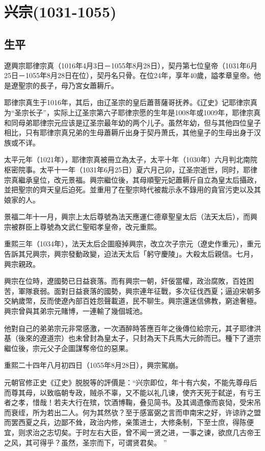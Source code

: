 
\section{兴宗\tiny(1031-1055)}

\subsection{生平}

遼興宗耶律宗真（1016年4月3日－1055年8月28日），契丹第七位皇帝（1031年6月25日－1055年8月28日在位），契丹名只骨。在位24年，享年40歲，謚孝章皇帝。他是遼聖宗的長子，母乃宮女蕭耨斤。

耶律宗真生于1016年，其后，由辽圣宗的皇后蕭菩薩哥抚养。《辽史》记耶律宗真为“圣宗长子”，实际上辽圣宗第六子耶律宗愿的生年是1008年或1009年，耶律宗真和同母弟耶律宗元应该是辽圣宗最年幼的两个儿子。虽然年幼，但与其他四位皇子相比，只有耶律宗真兄弟的生母蕭耨斤出身于契丹萧氏，其他皇子的生母出身于汉族或不详。

太平元年（1021年），耶律宗真被冊立為太子，太平十年（1030年）六月判北南院枢密院事。太平十一年（1031年6月25日）夏六月己卯，辽圣宗逝世，同时，耶律宗真繼承皇位，改元景福。興宗繼位後，其母順聖元妃蕭耨斤自立為皇太后攝政，並把聖宗的齊天皇后迫死。並重用了在聖宗時代被裁示永不錄用的貪官污吏以及其娘家的人。

景福二年十一月，興宗上太后尊號為法天應運仁德章聖皇太后（法天太后），而興宗被群臣上尊號為文武仁聖昭孝皇帝，改元重熙。

重熙三年（1034年），法天太后企圖廢掉興宗，改立次子宗元（遼史作重元），重元告訴其兄興宗，興宗發動政變，迫法天太后「躬守慶陵」。大殺太后親信。七月，興宗親政。

興宗在位時，遼國勢已日益衰落。而有興宗一朝，奸佞當權，政治腐敗，百姓困苦，軍隊衰弱。面對日益衰落的國勢，興宗連年征戰，多次征伐西夏；逼迫宋朝多交納歲幣，反而使遼內部百姓怨聲載道，民不聊生。興宗還迷信佛教，窮途奢極。興宗曾與其弟宗元賭博，一連輸了幾個城池。

他對自己的弟弟宗元非常感激，一次酒醉時答應百年之後傳位給宗元，其子耶律洪基（後來的遼道宗）也未曾封為皇太子，只封為天下兵馬大元帥而已。種下了道宗繼位後，宗元父子企圖謀奪帝位的惡果。

重熙二十四年八月初四日（1055年8月28日），興宗駕崩。

元朝官修正史《辽史》脱脱等的評價是：“兴宗即位，年十有六矣，不能先尊母后而尊其母，以致临朝专政，贼杀不辜，又不能以礼几谏，使齐天死于弑逆，有亏王者之孝，惜哉！若夫大行在殡，饮酒博鞠，叠见简书。及其谒遗像而哀恸，受宋吊而衰绖，所为若出二人。何为其然欤？至于感富弼之言而申南宋之好，许谅祚之盟而罢西夏之兵，边鄙不耸，政治内修，亲策进士，大修条制，下至士庶，得陈便宜，则求治之志切矣。于时左右大臣，曾不闻一贤之进，一事之谏，欲庶几古帝王之风，其可得乎？虽然，圣宗而下，可谓贤君矣。 ”

